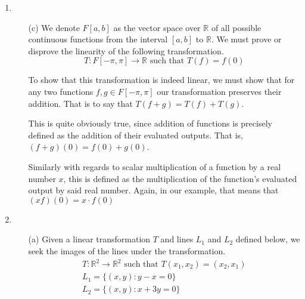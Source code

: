 \documentclass{article}
\newenvironment{answers}{ %
	\begin{enumerate}
		\setlength{\itemsep}{\bigskipamount}
}{\end{enumerate}}
\newcommand{\R}{\mathbb{R}}
\newcommand{\st}{\text{ such that }}
\begin{document}
\begin{answers}
\begin{enumerate}
				And regarding the preservation of vector addition, we may rely on the fact that \(\overline{z_1 + z_2} = \overline{z_1} + \overline{z_2}\).

			\item[(k)]
				\(T : \R^3 \to \R \st T(x_1, x_2, x_3) = x_1 + x_2 + \pi x_3\)

				This transformation is trivially linear since both of the following hold true.
				\begin{equation*}
					(x_1 + x_2 + \pi x_3) + (y_1 + y_2 + \pi y_3) = (x_1 + y_1) + (x_2 + y_2) + \pi(x_3 + y_3)
				\end{equation*}
				\begin{equation*}
					cx_1 + cx_2 + c\pi x_3 = c(x_1 + x_2 + \pi x_3)
				\end{equation*}
		\end{enumerate}

	\item
		\begin{enumerate}
			\item[(c)]
				We denote \(F[a,b]\) as the vector space over \(\R\) of all possible continuous functions from the interval \([a,b]\) to \(\R\). We must prove or disprove the linearity of the following transformation.
				\begin{equation*}
					T : F[-\pi,\pi] \to \R \st T(f) = f(0)
				\end{equation*}

				To show that this transformation is indeed linear, we must show that for any two functions \(f,g \in F[-\pi,\pi]\) our transformation preserves their addition. That is to say that \(T(f+g) = T(f) + T(g)\).

				This is quite obviously true, since addition of functions is precisely defined as the addition of their evaluated outputs. That is, \((f+g)(0) = f(0) + g(0)\).

				Similarly with regards to scalar multiplication of a function by a real number \(x\), this is defined as the multiplication of the function's evaluated output by said real number. Again, in our example, that means that \((xf)(0) = x \cdot f(0)\)
		\end{enumerate}

	\item
		\begin{enumerate}
			\item[(a)]
				Given a linear transformation \(T\) and lines \(L_1\) and \(L_2\) defined below, we seek the images of the lines under the transformation.
				\begin{gather*}
					T: \R^2 \to \R^2 \st T(x_1, x_2) = (x_2, x_1) \\
					L_1 = \{(x,y) : y - x = 0\} \\
					L_2 = \{(x,y) : x + 3y = 0\}
				\end{gather*}


\end{enumerate}
\end{answers}
\end{document}
